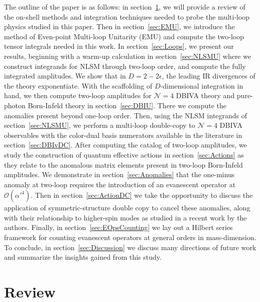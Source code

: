 \documentclass[11pt,letter]{article}
\def\sect#1{section~\ref{#1}}
\begin{document}
The outline of the paper is as follows: in \sect{sec:Review}, we will provide a review of the on-shell methods and integration techniques needed to probe the multi-loop physics studied in this paper. Then in \sect{sec:EMU}, we introduce the method of Even-point Multi-loop Unitarity (EMU) and compute the two-loop tensor integrals needed in this work. In \sect{sec:Loops}, we present our results, beginning with a warm-up calculation in \sect{sec:NLSMU} where we construct integrands for NLSM through two-loop order, and compute the fully integrated amplitudes. We show that in $D=2-2\epsilon$, the leading IR divergences of the theory exponentiate. With the scaffolding of $D$-dimensional integration in hand, we then compute two-loop amplitudes for $\mathcal{N}=4$ DBIVA theory and pure-photon Born-Infeld theory in \sect{sec:DBIU}. There we compute the anomalies present beyond one-loop order.  Then, using the NLSM integrands of \sect{sec:NLSMU}, we perform a multi-loop double-copy to $\mathcal{N}=4$ DBIVA observables with the color-dual basis numerators available in the literature in \sect{sec:DBIvDC}. After computing the catalog of two-loop amplitudes, we study the construction of quantum effective actions in \sect{sec:Actions} as they relate to the anomalous matrix elements present in two-loop Born-Infeld amplitudes. We demonstrate in \sect{sec:Anomalies} that the one-minus anomaly at two-loop requires the introduction of an evanescent operator at $\mathcal{O}(\alpha'^4)$. Then in \sect{sec:ActionDC} we take the opportunity to discuss the application of symmetric-structure double copy to cancel these anomalies, along with their relationship to higher-spin modes as studied in a recent work by the authors. Finally, in \sect{sec:EOpsCounting} we lay out a Hilbert series framework for counting evanescent operators at general orders in mass-dimension. To conclude, in \sect{sec:Discussion} we discuss many directions of future work and summarize the insights gained from this study. 


\section{Review} 
\label{sec:Review}
\end{document}

